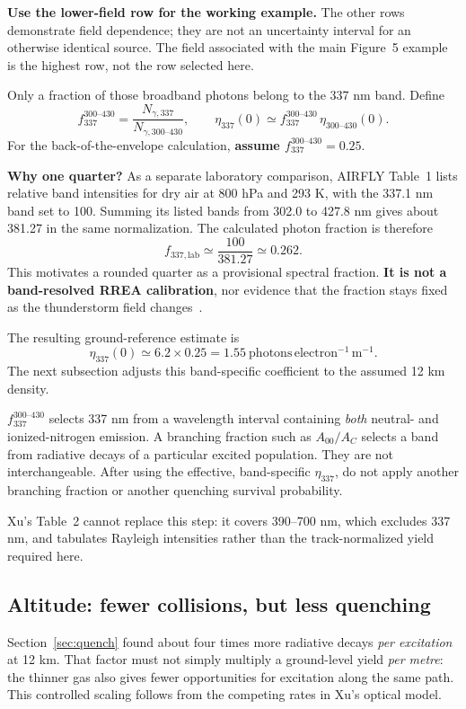 \documentclass[11pt,a4paper]{article}
\newcommand{\xu}[1]{\cite[#1]{Xu2015}}
\begin{document}
\textbf{Use the lower-field row for the working example.} The other rows demonstrate field dependence; they are not an uncertainty interval for an otherwise identical source. The field associated with the main Figure~5 example is the highest row, not the row selected here.

Only a fraction of those broadband photons belong to the 337 nm band. Define
\begin{equation}
 f_{337}^{300\text{--}430}
 =\frac{N_{\gamma,337}}{N_{\gamma,300\text{--}430}},\qquad
 \eta_{337}(0)\simeq
 f_{337}^{300\text{--}430}\,\eta_{300\text{--}430}(0).
 \label{eq:bandfraction}
\end{equation}
For the back-of-the-envelope calculation, \textbf{assume $f_{337}^{300\text{--}430}=0.25$}.

\textbf{Why one quarter?} As a separate laboratory comparison, AIRFLY Table~1 lists relative band intensities for dry air at 800 hPa and 293 K, with the 337.1 nm band set to 100. Summing its listed bands from 302.0 to 427.8 nm gives about 381.27 in the same normalization. The calculated photon fraction is therefore
\[
 f_{337,\mathrm{lab}}\simeq\frac{100}{381.27}\simeq0.262.
\]
This motivates a rounded quarter as a provisional spectral fraction. \textbf{It is not a band-resolved RREA calibration}, nor evidence that the fraction stays fixed as the thunderstorm field changes~\cite[Table~1, PDF p.~13]{AIRFLY2007}.

The resulting ground-reference estimate is
\[
 \eta_{337}(0)\simeq6.2\times0.25
 =1.55\ \mathrm{photons\,electron^{-1}\,m^{-1}}.
\]
The next subsection adjusts this band-specific coefficient to the assumed 12 km density.

\begin{keybox}
$f_{337}^{300\text{--}430}$ selects 337 nm from a wavelength interval containing \emph{both} neutral- and ionized-nitrogen emission. A branching fraction such as $A_{00}/A_C$ selects a band from radiative decays of a particular excited population. They are not interchangeable. After using the effective, band-specific $\eta_{337}$, do not apply another branching fraction or another quenching survival probability.
\end{keybox}

Xu's Table~2 cannot replace this step: it covers 390--700 nm, which excludes 337 nm, and tabulates Rayleigh intensities rather than the track-normalized yield required here.\xu{Table~2}

\clearpage
\subsection{Altitude: fewer collisions, but less quenching}
\label{sec:yieldaltitude}
Section~\ref{sec:quench} found about four times more radiative decays \emph{per excitation} at 12 km. That factor must not simply multiply a ground-level yield \emph{per metre}: the thinner gas also gives fewer opportunities for excitation along the same path. This controlled scaling follows from the competing rates in Xu's optical model.\xu{Secs.~2.2 and 4.2}
\end{document}
